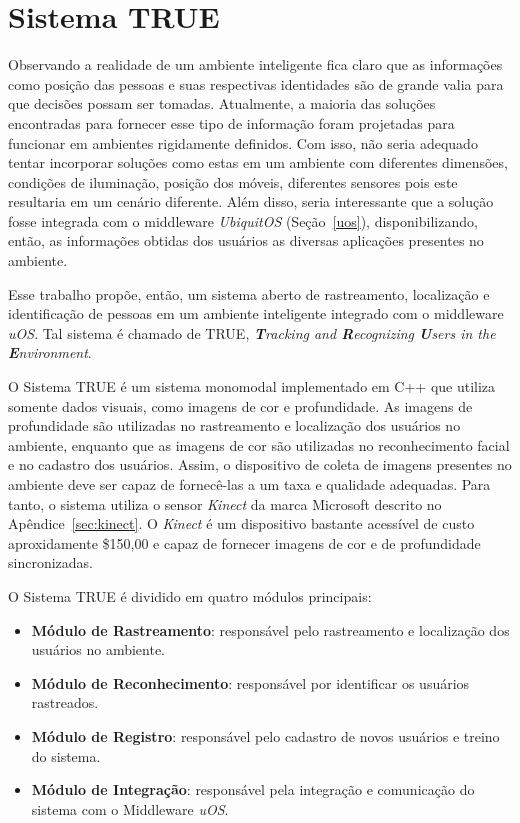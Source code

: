\chapter{Sistema TRUE}

Observando a realidade de um ambiente inteligente fica claro que as informações como posição das pessoas e suas respectivas identidades são de grande valia para que decisões possam ser tomadas. Atualmente, a maioria das soluções encontradas para fornecer esse tipo de informação foram projetadas para funcionar em ambientes rigidamente definidos. Com isso, não seria adequado tentar incorporar soluções como estas em um ambiente com diferentes dimensões, condições de iluminação, posição dos móveis, diferentes sensores pois este resultaria em um cenário diferente. Além disso, seria interessante que a solução fosse integrada com o middleware \textit{UbiquitOS} (Seção~\ref{uos}), disponibilizando, então, as informações obtidas dos usuários as diversas aplicações presentes no ambiente.


Esse trabalho propõe, então, um sistema aberto de rastreamento, localização e identificação de pessoas em um ambiente inteligente integrado com o middleware \textit{uOS}. Tal sistema é chamado de TRUE, \textit{\textbf{T}racking and \textbf{R}ecognizing \textbf{U}sers in the \textbf{E}nvironment}.

O Sistema TRUE é um sistema monomodal implementado em C++ que utiliza somente dados visuais, como imagens de cor e profundidade. As imagens de profundidade são utilizadas no rastreamento e localização dos usuários no ambiente, enquanto que as imagens de cor são utilizadas no reconhecimento facial e no cadastro dos usuários. Assim, o dispositivo de coleta de imagens presentes no ambiente deve ser capaz de fornecê-las a um taxa e qualidade adequadas. Para tanto, o sistema utiliza o sensor \textit{Kinect} da marca Microsoft descrito no Apêndice~\ref{sec:kinect}. O \textit{Kinect} é um dispositivo bastante acessível de custo aproxidamente \$150,00 e capaz de fornecer imagens de cor e de profundidade sincronizadas.

O Sistema TRUE é dividido em quatro módulos principais:

	\begin{itemize}
		\item \textbf{Módulo de Rastreamento}: responsável pelo rastreamento e localização dos usuários no ambiente.
		\item \textbf{Módulo de Reconhecimento}: responsável por identificar os usuários rastreados.
		\item \textbf{Módulo de Registro}: responsável pelo cadastro de novos usuários e treino do sistema.
		\item \textbf{Módulo de Integração}: responsável pela integração e comunicação do sistema com o Middleware \textit{uOS}.
	\end{itemize}

